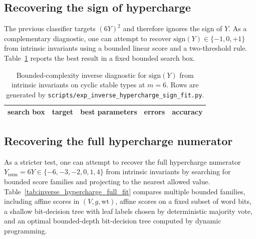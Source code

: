 \begin{table}[H]
\centering
\small
\setlength{\tabcolsep}{6pt}
\renewcommand{\arraystretch}{1.15}
%
\caption{Bounded-complexity inverse diagnostic for the hypercharge-squared class $(6Y)^2$ from intrinsic invariants on cyclic stable types at $m=6$. Rows are generated by \texttt{scripts/exp\_inverse\_hypercharge\_fit.py}.}
\label{tab:inverse_hypercharge_fit}
\end{table}

\subsection{Recovering the sign of hypercharge}

The previous classifier targets $(6Y)^2$ and therefore ignores the sign of $Y$.
As a complementary diagnostic, one can attempt to recover $\mathrm{sign}(Y)\in\{-1,0,+1\}$ from intrinsic invariants using a bounded linear score and a two-threshold rule.
Table~\ref{tab:inverse_hypercharge_sign_fit} reports the best result in a fixed bounded search box.

\begin{table}[H]
\centering
\small
\setlength{\tabcolsep}{6pt}
\renewcommand{\arraystretch}{1.15}
\begin{tabular}{l l l r r}
\toprule
search box & target & best parameters & errors & accuracy \\
\midrule
%
\end{tabular}
\caption{Bounded-complexity inverse diagnostic for $\mathrm{sign}(Y)$ from intrinsic invariants on cyclic stable types at $m=6$. Rows are generated by \texttt{scripts/exp\_inverse\_hypercharge\_sign\_fit.py}.}
\label{tab:inverse_hypercharge_sign_fit}
\end{table}

\subsection{Recovering the full hypercharge numerator}

As a stricter test, one can attempt to recover the full hypercharge numerator $Y_{\mathrm{num}}=6Y\in\{-6,-3,-2,0,1,4\}$ from intrinsic invariants by searching for bounded score families and projecting to the nearest allowed value.
Table~\ref{tab:inverse_hypercharge_full_fit} compares multiple bounded families, including affine scores in $(V,g,\mathrm{wt})$, affine scores on a fixed subset of word bits, a shallow bit-decision tree with leaf labels chosen by deterministic majority vote, and an optimal bounded-depth bit-decision tree computed by dynamic programming.

